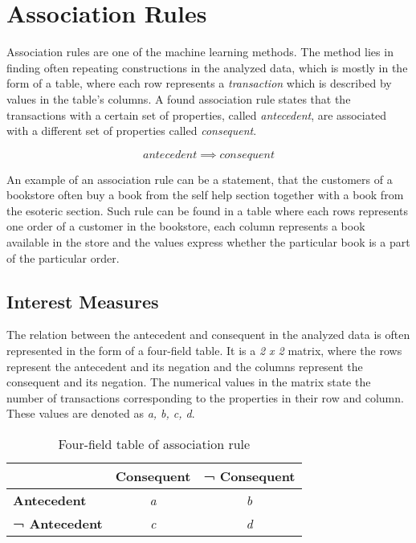 \chapter{Association Rules\label{assocrules}}

Association rules are one of the machine learning methods. The method lies in finding often repeating constructions in the analyzed data, which is mostly in the form of a table, where each row represents a \textit{transaction} which is described by values in the table's columns.\cite{Agrawal1993} A found association rule states that the transactions with a certain set of properties, called \textit{antecedent}, are associated with a different set of properties called \textit{consequent}. 

$$
antecedent \implies consequent
$$

An example of an association rule can be a statement, that the customers of a bookstore often buy a book from the self help section together with a book from the esoteric section. Such rule can be found in a table where each rows represents one order of a customer in the bookstore, each column represents a book available in the store and the values express whether the particular book is a part of the particular order.

\section{Interest Measures}

The relation between the antecedent and consequent in the analyzed data is often represented in the form of a four-field table. It is a \textit{2 x 2} matrix, where the rows represent the antecedent and its negation and the columns represent the consequent and its negation. The numerical values in the matrix state the number of transactions corresponding to the properties in their row and column. These values are denoted as \textit{a, b, c, d}.

\begin{table}[htbp]
\begin{center}
\begin{tabular}{l|c|c}
& \multicolumn{1}{l|}{\textbf{Consequent}} & \multicolumn{1}{l}{\textbf{¬ Consequent}} \\ \hline
\textbf{Antecedent} & \textit{a} & \textit{b} \\ \hline
\textbf{¬ Antecedent} & \textit{c} & \textit{d}
\end{tabular}
\end{center}
\caption{Four-field table of association rule}
\label{4ft}
\end{table}

